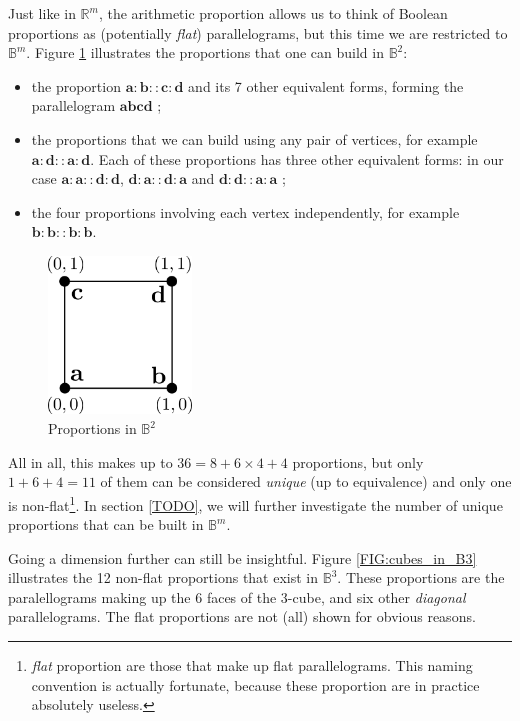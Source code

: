 Just like in $\mathbb{R}^m$, the arithmetic proportion allows us to think of
Boolean proportions as (potentially \textit{flat}) parallelograms, but this
time we are restricted to $\mathbb{B}^m$. Figure \ref{FIG:proportions_in_B2}
illustrates the proportions that one can build in $\mathbb{B}^2$:
\begin{itemize}
  \item the proportion $\mathbf{a}: \mathbf{b} :: \mathbf{c} : \mathbf{d}$ and
    its 7 other equivalent forms, forming the parallelogram
    $\mathbf{a}\mathbf{b}\mathbf{c}\mathbf{d}$ ;
  \item the proportions that we can build using any pair of vertices, for
    example $\mathbf{a} : \mathbf{d} :: \mathbf{a} : \mathbf{d}$. Each of these
    proportions has three other equivalent forms: in our case $\mathbf{a} :
    \mathbf{a} :: \mathbf{d} : \mathbf{d}$, $\mathbf{d} : \mathbf{a} ::
    \mathbf{d} : \mathbf{a}$ and $\mathbf{d} : \mathbf{d} :: \mathbf{a} :
    \mathbf{a}$ ;
  \item the four proportions involving each vertex independently, for example
    $\mathbf{b}:\mathbf{b}::\mathbf{b}:\mathbf{b}$.
\end{itemize}

\begin{figure}[!h]
\centering
\includegraphics[width=1.5in]{figures/proportions_in_B2.pdf}
  \caption{Proportions in $\mathbb{B}^2$}
\label{FIG:proportions_in_B2}
\end{figure}

All in all, this makes up to $36 = 8 + 6 \times 4 + 4$ proportions, but only $1
+ 6 + 4 = 11$ of them can be considered \textit{unique} (up to equivalence) and
only one is non-flat\footnote{\textit{flat} proportion are those that make up
flat parallelograms. This naming convention is actually fortunate, because
these proportion are in practice absolutely useless.}. In section \ref{TODO},
we will further investigate the number of unique proportions that can be built
in $\mathbb{B}^m$.

Going a dimension further can still be insightful. Figure \ref{FIG:cubes_in_B3}
illustrates the 12 non-flat proportions that exist in $\mathbb{B}^3$. These
proportions are the paralellograms making up the 6 faces of the $3$-cube, and
six other \textit{diagonal} parallelograms. The flat proportions are not (all)
shown for obvious reasons.

